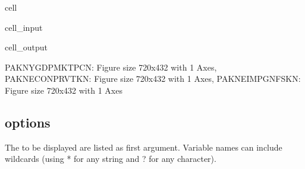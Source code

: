 \documentclass[letterpaper,10pt,english]{jupyterBook}
\begin{document}
\begin{sphinxuseclass}{cell}\begin{sphinxVerbatimInput}

\begin{sphinxuseclass}{cell_input}
\begin{sphinxVerbatim}[commandchars=\\\{\}]
  
\end{sphinxVerbatim}

\end{sphinxuseclass}\end{sphinxVerbatimInput}
\begin{sphinxVerbatimOutput}

\begin{sphinxuseclass}{cell_output}
\begin{sphinxVerbatim}[commandchars=\\\{\}]
\PYGZob{}\PYGZsq{}PAKNYGDPMKTPCN\PYGZsq{}: \PYGZlt{}Figure size 720x432 with 1 Axes\PYGZgt{},
 \PYGZsq{}PAKNECONPRVTKN\PYGZsq{}: \PYGZlt{}Figure size 720x432 with 1 Axes\PYGZgt{},
 \PYGZsq{}PAKNEIMPGNFSKN\PYGZsq{}: \PYGZlt{}Figure size 720x432 with 1 Axes\PYGZgt{}\PYGZcb{}
\end{sphinxVerbatim}

\end{sphinxuseclass}\end{sphinxVerbatimOutput}

\end{sphinxuseclass}

\subsection{ options}
\label{\detokenize{content/05_WBModels/ScenarioAnalysis:keep-plot-options}}
\sphinxAtStartPar
The  to be displayed are listed as first argument. Variable names can include
wildcards (using * for any string and ? for any character).

\sphinxAtStartPar
{}
\end{document}
